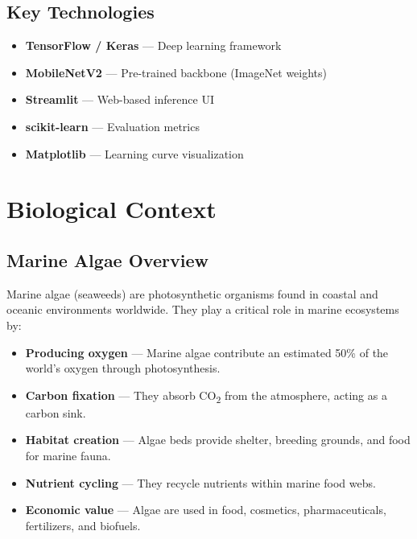 \documentclass[12pt,a4paper]{article}
\begin{document}
\subsection{Key Technologies}

\begin{itemize}
    \item \textbf{TensorFlow / Keras} --- Deep learning framework
    \item \textbf{MobileNetV2} --- Pre-trained backbone (ImageNet weights)
    \item \textbf{Streamlit} --- Web-based inference UI
    \item \textbf{scikit-learn} --- Evaluation metrics
    \item \textbf{Matplotlib} --- Learning curve visualization
\end{itemize}

\section{Biological Context}

\subsection{Marine Algae Overview}

Marine algae (seaweeds) are photosynthetic organisms found in coastal and oceanic environments worldwide. They play a critical role in marine ecosystems by:

\begin{itemize}
    \item \textbf{Producing oxygen} --- Marine algae contribute an estimated 50\% of the world's oxygen through photosynthesis.
    \item \textbf{Carbon fixation} --- They absorb CO\textsubscript{2} from the atmosphere, acting as a carbon sink.
    \item \textbf{Habitat creation} --- Algae beds provide shelter, breeding grounds, and food for marine fauna.
    \item \textbf{Nutrient cycling} --- They recycle nutrients within marine food webs.
    \item \textbf{Economic value} --- Algae are used in food, cosmetics, pharmaceuticals, fertilizers, and biofuels.
\end{itemize}
\end{document}
